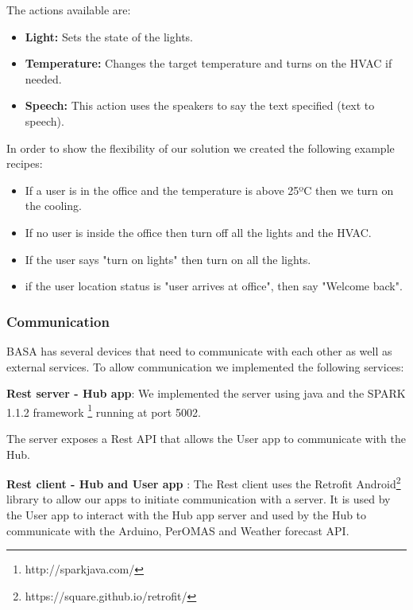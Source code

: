 \documentclass[conference]{IEEEtran}
\begin{document}
The actions available are:

\begin{itemize}
  \item \textbf{Light:} Sets the state of the lights.
  \item \textbf{Temperature:} Changes the target temperature and turns on the HVAC if needed.
  \item \textbf{Speech:} This action uses the speakers to say the text specified (text to speech).
\end{itemize}

In order to show the flexibility of our solution we created the following example recipes:
\begin{itemize}
  \item If a user is in the office and the temperature is above 25ºC then we turn on the cooling.
  \item If no user is inside the office then turn off all the lights and the HVAC.
  \item If the user says "turn on lights" then turn on all the lights.
  \item if the user location status is "user arrives at office", then say "Welcome back".
 
\end{itemize}








\subsubsection{Communication}

BASA has several devices that need to communicate with each other as well as external services. To allow communication we implemented the following services:


\textbf{Rest server - Hub app}: We implemented the server using java and the SPARK 1.1.2 framework \footnote{http://sparkjava.com/} running at port 5002.

The server exposes a Rest API that allows the User app to communicate with the Hub.

\textbf{Rest client - Hub and User app }: The Rest client  uses the Retrofit Android\footnote{https://square.github.io/retrofit/}  library to allow our apps to initiate communication with a server. It is used by the User app to interact with the Hub app server and used by the Hub to communicate with the Arduino, PerOMAS and Weather forecast API.
\end{document}
